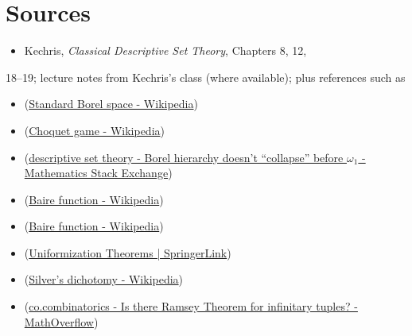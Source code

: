 \documentclass[11pt]{article}
\begin{document}
\section{Sources}
\label{sec:org6eabc18}
\begin{itemize}
\item Kechris, \emph{Classical Descriptive Set Theory}, Chapters 8, 12,
\end{itemize}
18--19; lecture notes from Kechris's class (where available);
plus references such as
\begin{itemize}
\item (\href{https://en.wikipedia.org/wiki/Standard\_Borel\_space\#:\~:text=A\%20measurable\%20space\%20Image\%3A\%20,algebra.\%5B\%201}{Standard Borel space - Wikipedia})
\item (\href{https://en.wikipedia.org/wiki/Choquet\_game\#:\~:text=All\%20nonempty\%20complete\%20metric\%20spaces,displaystyle}{Choquet game - Wikipedia})
\item (\href{https://math.stackexchange.com/questions/509326/borel-hierarchy-doesnt-collapse-before-omega-1\#:\~:text=,0\_\%7B\%5Cxi\%2B1}{descriptive set theory - Borel hierarchy doesn't ``collapse'' before \(\omega_1\) - Mathematics Stack Exchange})
\item (\href{https://en.wikipedia.org/wiki/Baire\_function\#:\~:text=,Baire\%20class\%20less\%20than\%20\%CE\%B1}{Baire function - Wikipedia})
\item (\href{https://en.wikipedia.org/wiki/Baire\_function\#:\~:text=Baire\%20class\%20of\%20a\%20countable,not\%20in\%20any\%20Baire\%20class}{Baire function - Wikipedia})
\item (\href{https://link.springer.com/content/pdf/10.1007/978-1-4612-4190-4\_18\#:\~:text=Given\%20two\%20sets\%20X\%2C\%20Y,a\%20uniformizing\%20function\%20for\%20P}{Uniformization Theorems | SpringerLink})
\item (\href{https://en.wikipedia.org/wiki/Silver\%27s\_dichotomy\#:\~:text=A\%20relation\%20is\%20said\%20to,2}{Silver's dichotomy - Wikipedia})
\item (\href{https://mathoverflow.net/questions/67483/is-there-ramsey-theorem-for-infinitary-tuples\#:\~:text=In\%20contrast\%2C\%20Galvin\%20and\%20Prikry,Bbb\%7BN}{co.combinatorics - Is there Ramsey Theorem for infinitary tuples? - MathOverflow})
\end{itemize}
\end{document}

